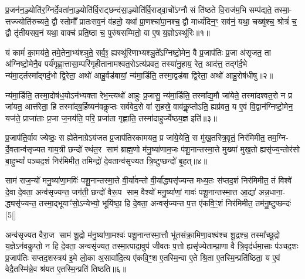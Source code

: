 \setcounter{anuvakam}{0}
प्र॒जन॑न॒ञ्ज्योति॑र॒ग्निर्दे॒वता॑ना॒ञ्ज्योति॑र्वि॒राट्छन्द॑सा॒ञ्ज्योति॑र्वि॒राड्वा॒चो᳚\-ऽग्नौ सं ति॑ष्ठते वि॒राज॑म॒भि सम्प॑द्यते॒ तस्मा॒- त्तज्ज्योति॑रुच्यते॒ द्वौ स्तोमौ᳚ प्रातःसव॒नं व॑हतो॒ यथा᳚ प्रा॒णश्चा॑पा॒नश्च॒ द्वौ माध्यं॑दिन॒ꣳ॒ सव॑नं॒ यथा॒ चख्षु॑श्च॒ श्रोत्रं॑ च॒ द्वौ तृ॑तीयसव॒नं यथा॒ वाक्च॑ प्रति॒ष्ठा च॒ पुरु॑षसम्मितो॒ वा ए॒ष य॒ज्ञो\-ऽस्थू॑रिः॥१॥

यं कामं॑ का॒मय॑ते॒ तमे॒तेना॒भ्य॑श्ञुते॒ सर्व॒ꣵ॒ ह्यस्थू॑रिणाभ्यश्ञु॒ते᳚\-ऽग्निष्टो॒मेन॒ वै प्र॒जाप॑तिः प्र॒जा अ॑सृजत॒ ता अ॑ग्निष्टो॒मेनै॒व पर्य॑गृह्णा॒त्तासा॒म्परि॑गृहीतानामश्वत॒रो\-ऽत्य॑प्रवत॒ तस्या॑नु॒हाय॒ रेत॒ आद॑त्त॒ तद्ग॑र्द॒भे न्य॑मा॒र्ट्तस्मा᳚द्गर्द॒भो द्वि॒रेता॒ अथो॑ आहु॒र्वड॑बायां॒ न्य॑मा॒र्डिति॒ तस्मा॒द्वड॑बा द्वि॒रेता॒ अथो॑ आहु॒रोष॑धीषु॥२॥

न्य॑मा॒र्डिति॒ तस्मा॒दोष॑ध॒यो\-ऽन॑भ्यक्ता रेभ॒न्त्यथो॑ आहुः प्र॒जासु॒ न्य॑मा॒र्डिति॒ तस्मा᳚द्य॒मौ जा॑येते॒ तस्मा॑दश्वत॒रो न प्र जा॑यत॒ आत्त॑रेता॒ हि तस्मा᳚द्ब॒र्\mbox{}हिष्यन॑वकॢप्तः सर्ववेद॒से वा॑ स॒हस्रे॒ वाव॑कॢ॒प्तो\-ऽति॒ ह्यप्र॑वत॒ य ए॒वं वि॒द्वान॑ग्निष्टो॒मेन॒ यज॑ते॒ प्राजा॑ताः प्र॒जा ज॒नय॑ति॒ परि॒ प्रजा॑ता गृह्णाति॒ तस्मा॑दाहुर्ज्येष्ठय॒ज्ञ इति॑॥३॥

प्र॒जाप॑ति॒र्वाव ज्येष्ठः॒ स ह्ये॑तेनाग्रे\-ऽय॑जत प्र॒जाप॑तिरकामयत॒ प्र जा॑ये॒येति॒ स मु॑ख॒तस्त्रि॒वृतं॒ निर॑मिमीत॒ तम॒ग्नि- र्दे॒वतान्व॑सृज्यत गाय॒त्री छन्दो॑ रथंत॒र साम॑ ब्राह्म॒णो म॑नु॒ष्या॑णाम॒जः प॑शू॒नान्तस्मा॒त्ते मुख्या॑ मुख॒तो ह्यसृ॑ज्य॒न्तोर॑सो बा॒हु\-भ्यां᳚ पञ्चद॒शं निर॑मिमीत॒ तमिन्द्रो॑ दे॒वतान्व॑सृज्यत त्रि॒ष्टुप्छन्दो॑ बृ॒हत्॥४॥

साम॑ राज॒न्यो॑ मनु॒ष्या॑णा॒मविः॑ पशू॒नान्तस्मा॒त्ते वी॒र्या॑वन्तो वी॒र्या᳚द्ध्यसृ॑ज्यन्त मध्य॒तः स॑प्तद॒शं निर॑मिमीत॒ तं विश्वे॑ दे॒वा दे॒वता॒ अन्व॑सृज्यन्त॒ जग॑ती॒ छन्दो॑ वैरू॒प साम॒ वैश्यो॑ मनु॒ष्या॑णां॒ गावः॑ पशू॒नान्तस्मा॒त्त आ॒द्या॑ अन्न॒धाना॒- द्ध्यसृ॑ज्यन्त॒ तस्मा॒द्भूयाꣳ॑सो॒\-ऽन्येभ्यो॒ भूयि॑ष्ठा॒ हि दे॒वता॒ अन्वसृ॑ज्यन्त प॒त्त ए॑कवि॒ꣳ॒शं निर॑मिमीत॒ तम॑नु॒ष्टुप्छन्दः॑ [5[]

अन्व॑सृज्यत वैरा॒ज साम॑ शू॒द्रो म॑नु॒ष्या॑णा॒मश्वः॑ पशू॒नान्तस्मा॒त्तौ भू॑तसंक्रा॒मिणा॒वश्व॑श्च शू॒द्रश्च॒ तस्मा᳚च्छू॒द्रो य॒ज्ञे\-ऽन॑वकॢप्तो॒ न हि दे॒वता॒ अन्वसृ॑ज्यत॒ तस्मा॒त्पादा॒वुप॑ जीवतः प॒त्तो ह्यसृ॑ज्येताम्प्रा॒णा वै त्रि॒वृद॑र्धमा॒साः प॑ञ्चद॒शः प्र॒जाप॑तिः सप्तद॒शस्त्रय॑ इ॒मे लो॒का अ॒सावा॑दि॒त्य ए॑कवि॒ꣳ॒श ए॒तस्मि॒न्वा ए॒ते श्रि॒ता ए॒तस्मि॒न्प्रति॑ष्ठिता॒ य ए॒वं वेदै॒तस्मि॑न्ने॒व श्र॑यत ए॒तस्मि॒न्प्रति॑ तिष्ठति॥६॥

